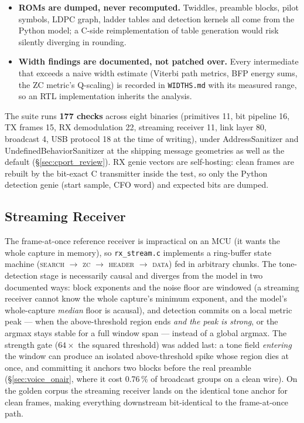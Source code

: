 \begin{itemize}
    \item \textbf{ROMs are dumped, never recomputed.}  Twiddles,
          preamble blocks, pilot symbols, LDPC graph, ladder tables and
          detection kernels all come from the Python model; a C-side
          reimplementation of table generation would risk silently
          diverging in rounding.
    \item \textbf{Width findings are documented, not patched over.}
          Every intermediate that exceeds a naive width estimate
          (Viterbi path metrics, BFP energy sums, the ZC metric's
          Q-scaling) is recorded in \texttt{WIDTHS.md} with its measured
          range, so an RTL implementation inherits the analysis.
\end{itemize}

The suite runs \textbf{177 checks} across eight binaries (primitives
11, bit pipeline 16, TX frames 15, RX demodulation 22, streaming
receiver 11, link layer 80, broadcast 4, USB protocol 18 at the time of
writing), under AddressSanitizer and UndefinedBehaviorSanitizer at the
shipping message geometries as well as the default
(\S\ref{sec:cport_review}).  RX genie vectors are self-hosting: clean frames
are rebuilt by the bit-exact C transmitter inside the test, so only the
Python detection genie (start sample, CFO word) and expected bits are
dumped.

\subsection{Streaming Receiver}
\label{sec:cport_stream}

The frame-at-once reference receiver is impractical on an MCU (it wants
the whole capture in memory), so \texttt{rx\_stream.c} implements a
ring-buffer state machine (\textsc{search} $\rightarrow$ \textsc{zc}
$\rightarrow$ \textsc{header} $\rightarrow$ \textsc{data}) fed in
arbitrary chunks.  The tone-detection stage is necessarily causal and
diverges from the model in two documented ways: block exponents and the
noise floor are windowed (a streaming receiver cannot know the whole
capture's minimum exponent, and the model's whole-capture \emph{median}
floor is acausal), and detection commits on a local metric peak ---
when the above-threshold region ends \emph{and the peak is strong}, or
the argmax stays stable for a full window span --- instead of a global
argmax.  The strength gate ($64\times$ the squared threshold) was
added last: a tone field \emph{entering} the window can produce an
isolated above-threshold spike whose region dies at once, and
committing it anchors two blocks before the real preamble
(\S\ref{sec:voice_onair}, where it cost 0.76\,\% of broadcast
groups on a clean wire).  On the golden corpus
the streaming receiver lands on the identical tone anchor for clean
frames, making everything downstream bit-identical to the
frame-at-once path.

